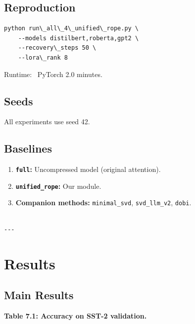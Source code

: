 \subsection{Reproduction}

\begin{lstlisting}
python run\_all\_4\_unified\_rope.py \
    --models distilbert,roberta,gpt2 \
    --recovery\_steps 50 \
    --lora\_rank 8
\end{lstlisting}

Runtime: ~PyTorch 2.0 minutes.

\subsection{Seeds}

All experiments use seed 42.

\subsection{Baselines}

\begin{enumerate}
\item \textbf{\texttt{full}:} Uncompressed model (original attention).
\item \textbf{\texttt{unified\_rope}:} Our module.
\item \textbf{Companion methods:} \texttt{minimal\_svd}, \texttt{svd\_llm\_v2}, \texttt{dobi}.
\end{enumerate}
\begin{lstlisting}

---
\end{lstlisting}


\section{Results}

\subsection{Main Results}

\textbf{Table 7.1: Accuracy on SST-2 validation.}

